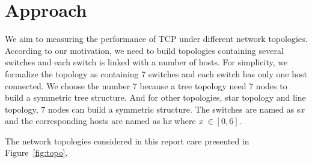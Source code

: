\section{Approach} \label{sec:approach}

We aim to measuring the performance of TCP under different network topologies.
According to our motivation, we need to build topologies containing several
switches and each switch is linked with a number of hosts. For simplicity,
we formalize the topology as containing 7 switches and each switch has only 
one host connected. We choose the number 7 because a tree topology need 7 nodes
to build a symmetric tree structure. And for other topologies, \eg star topology
and line topology, 7 nodes can build a symmetric structure. The switches are named
as s{\it x} and the corresponding hosts are named as h{\it x} where {\it x} $\in [0, 6]$.

The network topologies considered in this report care presented in Figure~\ref{fig:topo}.

